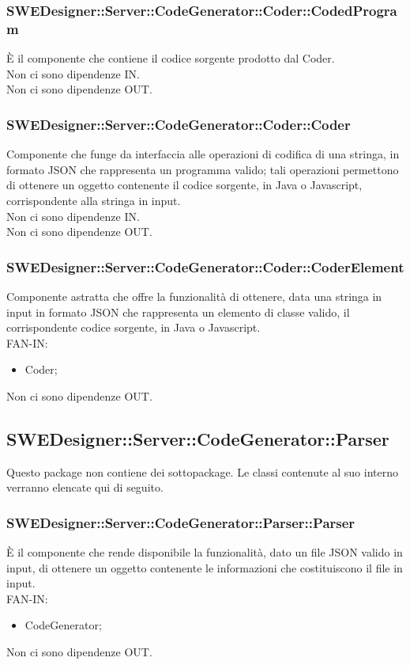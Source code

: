 \documentclass[../PianoDiQualifica.tex]{subfiles}
\begin{document}
		\subsubsection{SWEDesigner::Server::CodeGenerator::Coder::CodedProgram}
		È il componente che contiene il codice sorgente prodotto dal Coder.\\
		Non ci sono dipendenze IN.\\
		Non ci sono dipendenze OUT.
		\subsubsection{SWEDesigner::Server::CodeGenerator::Coder::Coder}
		Componente che funge da interfaccia alle operazioni di codifica di una stringa, in formato JSON che rappresenta un programma valido; tali operazioni permettono di ottenere un oggetto contenente il codice sorgente, in Java o Javascript, corrispondente alla stringa in input.\\
		Non ci sono dipendenze IN.\\
		Non ci sono dipendenze OUT.
		\subsubsection{SWEDesigner::Server::CodeGenerator::Coder::CoderElement}
		Componente astratta che offre la funzionalità di ottenere, data una stringa in input in formato JSON che rappresenta un elemento di classe valido, il corrispondente codice sorgente, in Java o Javascript.\\
		FAN-IN:
		\begin{itemize}
			\item Coder;
		\end{itemize}
		Non ci sono dipendenze OUT.
		\subsection{SWEDesigner::Server::CodeGenerator::Parser}
		Questo package non contiene dei sottopackage.
		Le classi contenute al suo interno verranno elencate qui di seguito.
		\subsubsection{SWEDesigner::Server::CodeGenerator::Parser::Parser}
		È il componente che rende disponibile la funzionalità, dato un file JSON valido in input, di ottenere un oggetto contenente le informazioni che costituiscono il file in input.\\
		FAN-IN:
		\begin{itemize}
			\item CodeGenerator;
		\end{itemize}
		Non ci sono dipendenze OUT.
\end{document}
